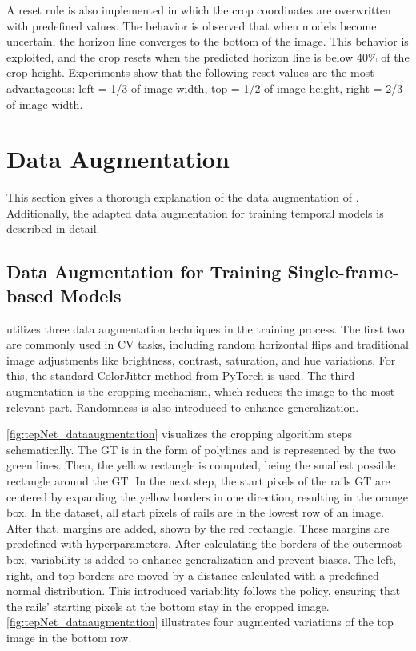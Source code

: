 A reset rule is also implemented in which the crop coordinates are overwritten with predefined values.
The behavior is observed that when models become uncertain, the horizon line converges to the bottom of the image.
This behavior is exploited, and the crop resets when the predicted horizon line is below 40\% of the crop height.
Experiments show that the following reset values are the most advantageous: left = 1/3 of image width, top = 1/2 of image height, right = 2/3 of image width.

\clearpage

\section{Data Augmentation}
\label{sec:dataaugmentation}

This section gives a thorough explanation of the data augmentation of \cite{tepNet2024}.
Additionally, the adapted data augmentation for training temporal models is described in detail.

\subsection{Data Augmentation for Training Single-frame-based Models}

\cite{tepNet2024} utilizes three data augmentation techniques in the training process.
The first two are commonly used in \ac{CV} tasks, including random horizontal flips and traditional image adjustments like brightness, contrast, saturation, and hue variations.
For this, the standard ColorJitter \cite{pytorch_colorJitter_docu} method from PyTorch is used.
The third augmentation is the cropping mechanism, which reduces the image to the most relevant part.
Randomness is also introduced to enhance generalization.

\autoref{fig:tepNet_dataaugmentation} visualizes the cropping algorithm steps schematically.
The \ac{GT} is in the form of polylines and is represented by the two green lines.
Then, the yellow rectangle is computed, being the smallest possible rectangle around the \ac{GT}.
In the next step, the start pixels of the rails \ac{GT} are centered by expanding the yellow borders in one direction, resulting in the orange box.
In the dataset, all start pixels of rails are in the lowest row of an image.
After that, margins are added, shown by the red rectangle.
These margins are predefined with hyperparameters.
After calculating the borders of the outermost box, variability is added to enhance generalization and prevent biases.
The left, right, and top borders are moved by a distance calculated with a predefined normal distribution.
This introduced variability follows the policy, ensuring that the rails' starting pixels at the bottom stay in the cropped image.
\autoref{fig:tepNet_dataaugmentation} illustrates four augmented variations of the top image in the bottom row.

